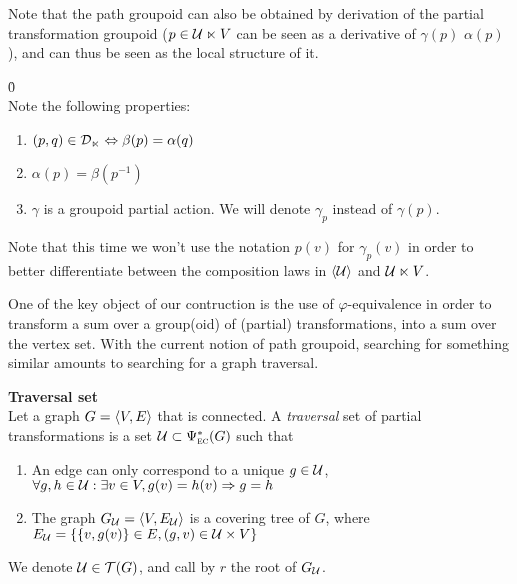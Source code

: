 \begin{remark}Note that the path groupoid can also be obtained by derivation of the partial transformation groupoid (\ie $p \in \mathcal{U} \ltimes V$ can be seen as a derivative of $\gamma(p)$ \wrt $\alpha(p)$), and can thus be seen as the local structure of it.
\end{remark}

\begin{lemma}\h{0}\\
Note the following properties:
\begin{enumerate}
  \item $(p,q) \in \mathcal{D}_{\ltimes} \Leftrightarrow \beta(p) = \alpha(q)$
  \item $\alpha(p) = \beta(p^{-1})$
  \item $\gamma$ is a groupoid partial action. We will denote $\gamma_p$ instead of $\gamma(p)$. \label{enum:3}
\end{enumerate}
\end{lemma}

\begin{remark}
Note that this time we won't use the notation $p(v)$ for $\gamma_p(v)$ in order to better differentiate between the composition laws in $\langle \mathcal{U} \rangle$ and $\mathcal{U} \ltimes V$.
\end{remark}

One of the key object of our contruction is the use of $\varphi$-equivalence in order to transform a sum over a group(oid) of (partial) transformations, into a sum over the vertex set. With the current notion of path groupoid, searching for something similar amounts to searching for a graph traversal.

\begin{definition}\textbf{Traversal set}\\
Let a graph $G = \langle V, E \rangle$ that is connected. A \emph{traversal} set of partial transformations is a set $\mathcal{U} \subset \Psi_{\operatorname{\textsc{ec}}}^*(G)$ such that
\begin{enumerate}
  \item An edge can only correspond to a unique $g\in \mathcal{U}$,\\
    \ie $\forall g,h \in \mathcal{U} : \exists v \in V, g(v) = h(v) \Rightarrow g=h$
  \item The graph $G_{\mathcal{U}} = \langle V, E_{\mathcal{U}} \rangle$ is a covering tree of $G$, where\\
    $E_{\mathcal{U}} = \{\{v, g(v)\} \in E, (g, v) \in \mathcal{U} \times V\}$
\end{enumerate}
We denote $\mathcal{U} \in \operatorname{\mathcal{T}}(G)$, and call by $r$ the root of $G_{\mathcal{U}}$.
\end{definition}

